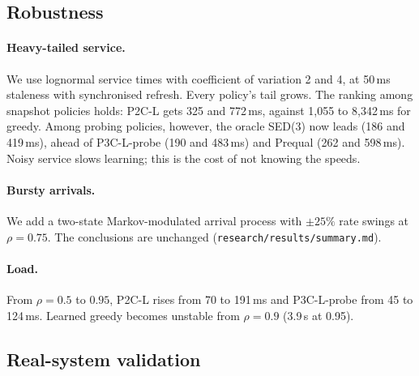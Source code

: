 \documentclass[10pt,twocolumn,letterpaper]{article}
\newif\ifrealsys\realsysfalse %
\begin{document}
\subsection{Robustness}
\paragraph{Heavy-tailed service.} We use lognormal service times with
coefficient of variation 2 and 4, at 50\,ms staleness with synchronised
refresh. Every policy's tail grows. The ranking among snapshot policies holds:
P2C-L gets 325 and 772\,ms, against 1{,}055 to 8{,}342\,ms for greedy. Among
probing policies, however, the oracle SED(3) now leads (186 and 419\,ms),
ahead of P3C-L-probe (190 and 483\,ms) and Prequal (262 and 598\,ms). Noisy
service slows learning; this is the cost of not knowing the speeds.

\paragraph{Bursty arrivals.} We add a two-state Markov-modulated arrival
process with $\pm25\%$ rate swings at $\rho=0.75$. The conclusions are
unchanged (\texttt{research/results/summary.md}).

\paragraph{Load.} From $\rho=0.5$ to $0.95$, P2C-L rises from 70 to 191\,ms
and P3C-L-probe from 45 to 124\,ms. Learned greedy becomes unstable from
$\rho=0.9$ (3.9\,s at 0.95).

\ifrealsys
\subsection{Real-system validation}
\label{sec:eval-real}
\end{document}
